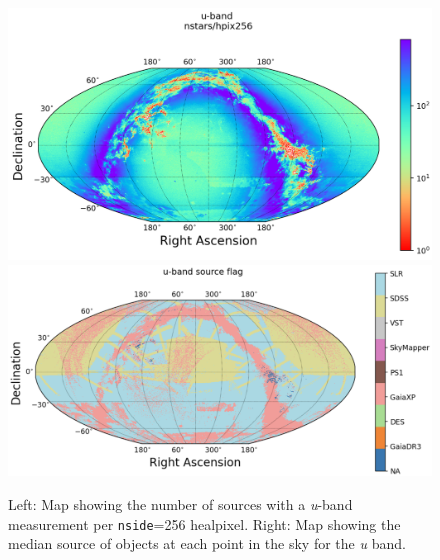 \begin{figure}
    \includegraphics[width=0.48\linewidth]{./figures/source_density_maps/u-band-counts-full.png}
    \includegraphics[width=0.48\linewidth]{./figures/source_survey_maps/u-band_source.png}
    \caption{Left: Map showing the number of sources with a \textit{u}-band measurement per \texttt{nside}=256 healpixel.
    Right: Map showing the median source of objects at each point in the sky for the \textit{u} band.}
    \label{fig:monster-u}
\end{figure}

